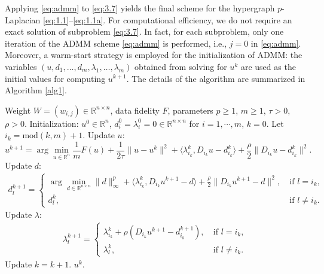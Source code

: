 \documentclass{article}
\theoremstyle{definition}
\begin{document}
Applying \eqref{eq:admm} to \eqref{eq:3.7} yields the final scheme for the hypergraph $p$-Laplacian \eqref{eq:1.1}--\eqref{eq:1.1a}.
For computational efficiency, we do not require an exact solution of subproblem \eqref{eq:3.7}. In fact, for each subproblem, only one iteration of the ADMM scheme \eqref{eq:admm} is performed, i.e., $j = 0$ in \eqref{eq:admm}. Moreover, a warm-start strategy is employed for the initialization of ADMM: the variables $(u, d_1, \dots, d_m, \lambda_1, \dots, \lambda_m)$ obtained from solving for $u^{k}$ are used as the initial values for computing $u^{k+1}$.
The details of the algorithm are summarized in Algorithm \ref{alg1}.



\begin{algorithm}[H]
  \caption{Operator-splitting algorithm for the hypergraph $p$-Laplacian \eqref{eq:1.1}--\eqref{eq:1.1a}.}
  \label{alg1}
  \begin{algorithmic}
  \REQUIRE Weight $W=(w_{i,j})\in\mathbb{R}^{n\times n}$, data fidelity $F$,
  parameters $p\geq 1$, $m\geq 1$, $\tau>0$, $\rho>0$.
  \STATE Initialization: $u^{0}\in\mathbb{R}^n$, $d_i^0=\lambda_i^0=0\in \mathbb{R}^{n\times n}$
  for $i=1,\cdots,m$, $k=0$.
  \STATE Let $i_k=\mbox{mod}(k,m)+1$.
  \STATE Update $u$:
  \begin{equation}\label{eq:3.8}
    u^{k+1}=\arg\min_{u\in\mathbb{R}^n}
  \frac{1}{m} F(u)+\frac{1}{2\tau} \|u-u^k\|^2+\langle \lambda_{i_k}^{k}, D_{i_k}u-d_{i_k}^{k}\rangle+\frac{\rho}{2}\|D_{i_k}u-d_{i_k}^{k}\|^2.
  \end{equation}
  \STATE Update $d$:
  \begin{align}\label{eq:3.9}
    d^{k+1}_l=
    \begin{cases}
    \arg\min\limits_{d\in\mathbb{R}^{n\times n}} \|d\|^p_\infty
  +\langle \lambda_{i_k}^{k}, D_{i_k}u^{k+1}-d\rangle+\frac{\rho}{2}\|D_{i_k}u^{k+1}-d\|^2,
    ~ &\mbox{if } l= i_k, \\
    d^{k}_l, ~ &\mbox{if } l\neq i_k.
  \end{cases}
  \end{align}
  \STATE Update $\lambda$:
  \begin{align}\label{eq:3.10}
  \lambda^{k+1}_l=
  \begin{cases}
    \lambda_{i_k}^{k}+\rho(D_{i_k}u^{k+1}-d_{i_k}^{k+1}),
    ~ &\mbox{if } l= i_k, \\
    \lambda^{k}_l, ~ &\mbox{if } l\neq i_k.
  \end{cases}
  \end{align}
  \STATE Update $k=k+1$.
  \ENDWHILE
  \RETURN $u^{k}$.
  \end{algorithmic}
  \end{algorithm}
\end{document}
